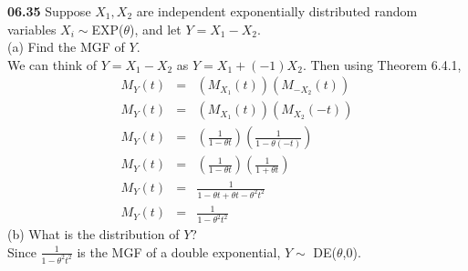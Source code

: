 {\bf 06.35}
Suppose $X_1, X_2$ are independent exponentially distributed random variables $X_i\sim$EXP($\theta$), and let $Y=X_1-X_2$.\\
(a) Find the MGF of $Y$.\\
We can think of $Y=X_1-X_2$ as $Y=X_1+(-1)X_2$. Then using Theorem 6.4.1,
\begin{eqnarray*}
M_{Y}(t) & = & (M_{X_1} (t))(M_{-X_2} (t))\\
M_{Y}(t) & = & (M_{X_1}(t))(M_{X_2}(-t))\\
M_{Y}(t) & = & \left(\frac{1}{1-\theta t}\right)\left(\frac{1}{1-\theta (-t)}\right)\\
M_Y(t) &=& \left(\frac{1}{1-\theta t}\right)\left(\frac{1}{1+\theta t}\right)\\
M_Y(t) & = & \frac{1}{1-\theta t +\theta t-\theta^2 t^2}\\
M_Y(t) & = & \frac{1}{1-\theta^2 t^2}
\end{eqnarray*}
(b) What is the distribution of $Y$?\\
Since $\frac{1}{1-\theta^2 t^2}$ is the MGF of a double exponential,  $Y\sim$ DE($\theta$,$0$).
